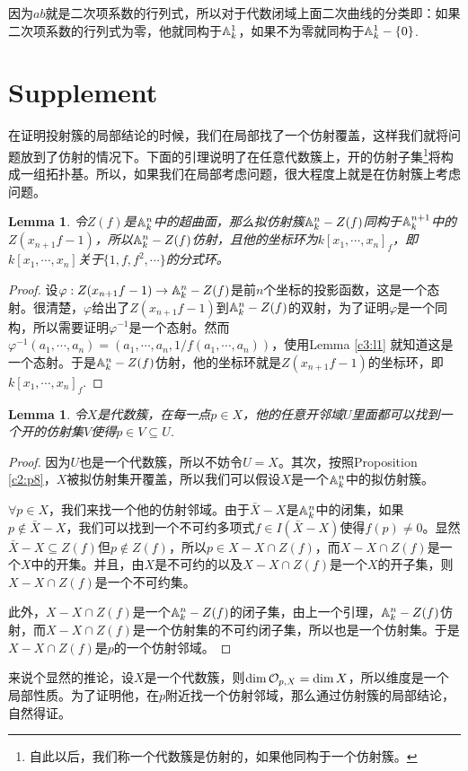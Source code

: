 \documentclass[9pt]{extbook}
\theoremstyle{plain}%
\newtheorem{lem}[defi]{Lemma}%
\begin{document}
因为$ab$就是二次项系数的行列式，所以对于代数闭域上面二次曲线的分类即：如果二次项系数的行列式为零，他就同构于$\mathbb{A}^1_k$，如果不为零就同构于$\mathbb{A}^1_k-\{0\}$.

\section*{Supplement}
在证明投射簇的局部结论的时候，我们在局部找了一个仿射覆盖，这样我们就将问题放到了仿射的情况下。下面的引理说明了在任意代数簇上，开的仿射子集\footnote{自此以后，我们称一个代数簇是仿射的，如果他同构于一个仿射簇。}将构成一组拓扑基。所以，如果我们在局部考虑问题，很大程度上就是在仿射簇上考虑问题。
\begin{lem}
	令$Z(f)$是$\mathbb{A}^n_k$中的超曲面，那么拟仿射簇$\mathbb{A}^n_k-Z(f)$同构于$\mathbb{A}^{n+1}_{k}$中的$Z(x_{n+1}f-1)$，所以$\mathbb{A}^n_k-Z(f)$仿射，且他的坐标环为$k[x_1,\cdots,x_n]_f$，即$k[x_1,\cdots,x_n]$关于$\{1,f,f^2,\cdots\}$的分式环。
\end{lem}
\begin{proof}
	设$\varphi:Z(x_{n+1}f-1)\to \mathbb{A}^n_k-Z(f)$是前$n$个坐标的投影函数，这是一个态射。很清楚，$\varphi$给出了$Z(x_{n+1}f-1)$到$\mathbb{A}^n_k-Z(f)$的双射，为了证明$\varphi$是一个同构，所以需要证明$\varphi^{-1}$是一个态射。然而$\varphi^{-1}(a_1,\cdots,a_n)=(a_1,\cdots,a_n,1/f(a_1,\cdots,a_n))$，使用Lemma \ref{c3:l1} 就知道这是一个态射。于是$\mathbb{A}^n_k-Z(f)$仿射，他的坐标环就是$Z(x_{n+1}f-1)$的坐标环，即$k[x_1,\cdots,x_n]_f$.
\end{proof}

\begin{lem}
	令$X$是代数簇，在每一点$p\in X$，他的任意开邻域$U$里面都可以找到一个开的仿射集$V$使得$p\in V\subseteq U$.
\end{lem}
\begin{proof}
	因为$U$也是一个代数簇，所以不妨令$U=X$。其次，按照Proposition \ref{c2:p8}，$X$被拟仿射集开覆盖，所以我们可以假设$X$是一个$\mathbb{A}^n_k$中的拟仿射簇。

	$\forall p\in X$，我们来找一个他的仿射邻域。由于$\bar{X}-X$是$\mathbb{A}^n_k$中的闭集，如果$p\notin \bar{X}-X$，我们可以找到一个不可约多项式$f\in I(\bar{X}-X)$使得$f(p)\neq 0$。显然$\bar{X}-X\subseteq Z(f)$但$p\notin Z(f)$，所以$p\in X-X\cap Z(f)$，而$X-X\cap Z(f)$是一个$X$中的开集。并且，由$X$是不可约的以及$X-X\cap Z(f)$是一个$X$的开子集，则$X-X\cap Z(f)$是一个不可约集。

	此外，$X-X\cap Z(f)$是一个$\mathbb{A}^n_k-Z(f)$的闭子集，由上一个引理，$\mathbb{A}^n_k-Z(f)$仿射，而$X-X\cap Z(f)$是一个仿射集的不可约闭子集，所以也是一个仿射集。于是$X-X\cap Z(f)$是$p$的一个仿射邻域。
\end{proof}
来说个显然的推论，设$X$是一个代数簇，则$\dim \mathcal{O}_{p,X}=\dim X$，所以维度是一个局部性质。为了证明他，在$p$附近找一个仿射邻域，那么通过仿射簇的局部结论，自然得证。
\end{document}

